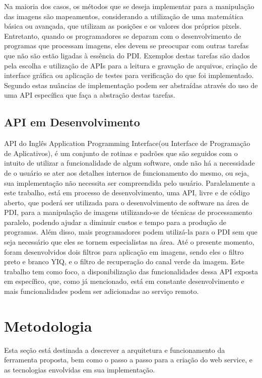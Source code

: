 \documentclass[12pt]{article}
\begin{document}
Na maioria dos casos, os métodos que se deseja implementar para a manipulação das imagens são mapeamentos, considerando a utilização de uma matemática
básica ou avançada, que utilizam as posições e os valores dos próprios pixels. Entretanto, quando os programadores se deparam com o desenvolvimento de
programas que processam imagens, eles devem se preocupar com outras tarefas que não são estão ligadas à essência do PDI. Exemplos destas tarefas são dados
pela escolha e utilização de APIs para a leitura e gravação de arquivos, criação de interface gráfica ou aplicação de testes para verificação do que foi
implementado. Segundo \cite{gonzalez:08,jain:89} estas nuâncias de implementação podem ser abstraídas através do uso de uma API específica que faça a abstração destas tarefas.

\subsection{API em Desenvolvimento}

API do Inglês Application Programming Interface(ou Interface de Programação de Aplicativos), é um conjunto de rotinas e padrões que são seguidos com o intuito de utilizar a funcionalidade de algum software, onde não há a necessidade de o usuário se ater aos detalhes internos de funcionamento do mesmo, ou seja, sua implementação não necessita ser compreendida pelo usuário. 
Paralelamente a este trabalho, está em processo de desenvolvimento, uma API, livre e de código aberto, que poderá ser utilizada para o desenvolvimento de software na área de PDI, para a manipulação de imagens utilizando-se de técnicas de processamento paralelo, podendo ajudar a diminuir custos e tempo para a produção de programas. Além disso, mais programadores podem utilizá-la para o PDI sem que seja necessário que eles se tornem especialistas na área.
Até o presente momento, foram desenvolvidos dois filtros para aplicação em imagens, sendo eles o filtro preto e branco YIQ, e o filtro de recuperação do canal verde da imagem. Este trabalho tem como foco, a disponibilização das funcionalidades dessa API exposta em específico, que, como já mencionado, está em constante desenvolvimento e mais funcionalidades podem ser adicionadas ao serviço remoto.

\section{Metodologia}

Esta seção está destinada a descrever a arquitetura e funcionamento da ferramenta proposta, bem como o passo a passo para a criação do web service, e as tecnologias envolvidas em sua implementação.
\end{document}

